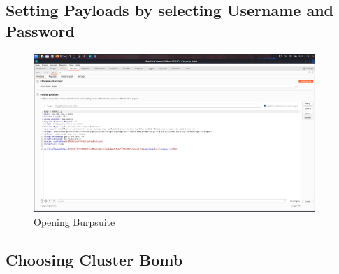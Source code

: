 \documentclass[11pt]{article}
\begin{document}
\subsection{Setting Payloads by selecting Username and Password}




\begin{figure}[H]
    \centering
    \includegraphics[width=0.95\textwidth]{burpsuite (4).png}
    \caption{Opening Burpsuite}
    \label{fig:1}
\end{figure}
\subsection{Choosing Cluster Bomb}

\end{document}
